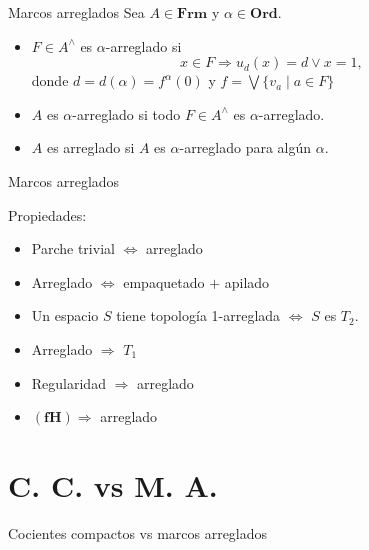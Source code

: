 \documentclass[compress,12pt]{beamer}
\begin{document}
\begin{frame}{Marcos arreglados}
    Sea $A\in \mathbf{Frm}$ y $\alpha\in \mathbf{Ord}$. 
    \begin{itemize}
        \item $F\in A^\wedge$ es $\alpha$-arreglado si 
    \[
    x\in F\Rightarrow u_d(x)=d\vee x=1,
    \]
    donde $d=d(\alpha)=f^\alpha(0)$ y $f=\bigvee\{v_a\mid a\in F\}$
    \item $A$ es $\alpha$-arreglado si todo $F\in A^\wedge$ es $\alpha$-arreglado.
    \item $A$ es arreglado si $A$ es $\alpha$-arreglado para algún $\alpha$.
    \end{itemize}
\end{frame}

\begin{frame}{Marcos arreglados}
    \begin{block}{Propiedades:}
        \begin{itemize}
            \item Parche trivial $\Leftrightarrow$ arreglado
            \item Arreglado $\Leftrightarrow $ empaquetado $+$ apilado
            \item Un espacio $S$ tiene topología 1-arreglada $\Leftrightarrow$ $S$ es $T_2$.
            \item Arreglado $\Rightarrow$ $T_1$
            \item Regularidad $\Rightarrow$ arreglado
            \item $(\mathbf{fH})\Rightarrow$ arreglado
        \end{itemize}
    \end{block}
\end{frame}

\section{C. C. vs M. A.}
\begin{frame}{Cocientes compactos vs marcos arreglados}

\end{frame}
    
\end{document}
